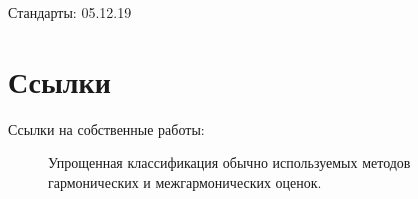 
Стандарты:
\cite{ГОСТ30804.4.7-2013}
\cite{ГОСТ30804.4.30-2013}
\cite{ГОСТ33073-2014}
\cite{ГОСТ32144-2013}
\cite{ГОСТР54149-2010}
\cite{ГОСТР51317.4.30-2008}
\cite{ГОСТР51317.4.7-2008}
\cite{ГОСТР8.655-2009}
\cite{ГОСТ13109-97}
\cite{ГОСТ13109-87}
\cite{ГОСТ8.216-88}
\cite{ГОСТ19431-84}
\cite{ГОСТ12.3.019-80}
\cite{ГОСТ21027-75}
\cite{ГОСТ16263-70}
\cite{ГОСТ13109-67}
\cite{ГОСТР51317.4.15-2012}
\cite{ГОСТ8.622-2013}
05.12.19
\cite{IEEE519-2014}


\section{Ссылки}\label{sec:ch1/sec2}

Ссылки на собственные работы:

\cite{альтман2019кэш}
\cite{васеева2019сравнительный}
\cite{васеева2019}
\cite{васеева2018информационно}
\cite{васееваисследование}
\cite{александров2018оценка}
\cite{васеева2018применение}
\cite{альтман2018расширение}
\cite{терентьева2017алгоритм}
\cite{альтман2017применение}
\cite{васеева2017распознавание}
\cite{Васеева2017}




\begin{figure}[ht]
	\caption{Упрощенная классификация обычно используемых методов гармонических и межгармонических оценок.}\label{fig:picture2}
\end{figure}



